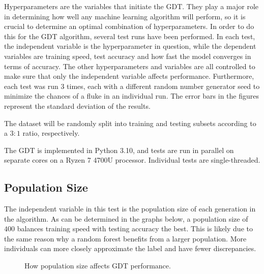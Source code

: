 \documentclass[12pt]{article}
\begin{document}
Hyperparameters are the variables that initiate the GDT. They play a major role in determining how well any machine learning algorithm will perform, so it is crucial to determine an optimal combination of hyperparameters. In order to do this for the GDT algorithm, several test runs have been performed. In each test, the independent variable is the hyperparameter in question, while the dependent variables are training speed, test accuracy and how fast the model converges in terms of accuracy. The other hyperparameters and variables are all controlled to make sure that only the independent variable affects performance. Furthermore, each test was run $3$ times, each with a different random number generator seed to minimize the chances of a fluke in an individual run. The error bars in the figures represent the standard deviation of the results.

The dataset will be randomly split into training and testing subsets according to a $3:1$ ratio, respectively.

The GDT is implemented in Python 3.10, and tests are run in parallel on separate cores on a Ryzen 7 4700U processor. Individual tests are single-threaded.

\subsection{Population Size}

The independent variable in this test is the population size of each generation in the algorithm. As can be determined in the graphs below, a population size of $400$ balances training speed with testing accuracy the best. This is likely due to the same reason why a random forest benefits from a larger population. More individuals can more closely approximate the label and have fewer discrepancies.

\begin{figure}[H]
    \centering
    \caption{How population size affects GDT performance.}
\end{figure}
\end{document}
